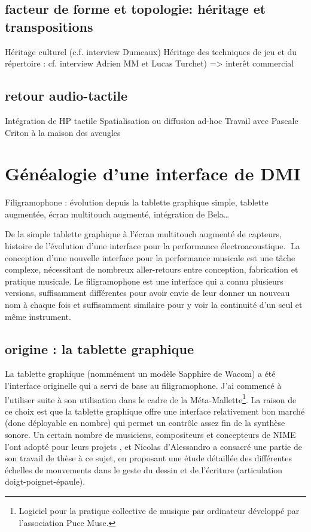 
\subsection{facteur de forme et topologie: héritage et transpositions}
Héritage culturel (c.f. interview Dumeaux)
Héritage des techniques de jeu et du répertoire : cf. interview Adrien MM et Lucas Turchet) => interêt commercial  



\subsection{retour audio-tactile}
Intégration de HP tactile
Spatialisation ou diffusion ad-hoc
Travail avec Pascale Criton à la maison des aveugles


\section{Généalogie d’une interface de DMI}
\label{sec:interfaces:sec1}

Filigramophone : évolution depuis la tablette graphique simple, tablette augmentée, écran multitouch augmenté, intégration de Bela…

De la simple tablette graphique à l’écran multitouch augmenté de capteurs, histoire de l’évolution d’une interface pour la performance électroacoustique.
La conception d’une nouvelle interface pour la performance musicale est une tâche complexe, nécessitant de nombreux aller-retours entre conception, fabrication et pratique musicale. Le filigramophone est une interface qui a connu plusieurs versions, suffisamment différentes pour avoir envie de leur donner un nouveau nom à chaque fois et suffisamment similaire pour y voir la continuité d’un seul et même instrument.

\subsection{origine : la tablette graphique}
La tablette graphique (nommément un modèle Sapphire de Wacom) a été l’interface originelle qui a servi de base au filigramophone. J’ai commencé à l’utiliser suite à son utilisation dans le cadre de la Méta-Mallette\footnote{Logiciel pour la pratique collective de musique par ordinateur développé par l’association Puce Muse.}. La raison de ce choix est que la tablette graphique offre une interface relativement bon marché (donc déployable en nombre) qui permet un contrôle assez fin de la synthèse sonore.
Un certain nombre de musiciens, compositeurs et concepteurs de NIME l’ont adopté pour leurs projets \cite{zbyszynski_ten_2007}, et Nicolas d’Alessandro a consacré une partie de son travail de thèse \cite{dalessandro_realtime_2009} à ce sujet, en proposant une étude détaillée des différentes échelles de mouvements dans le geste du dessin et de l'écriture (articulation doigt-poignet-épaule).

